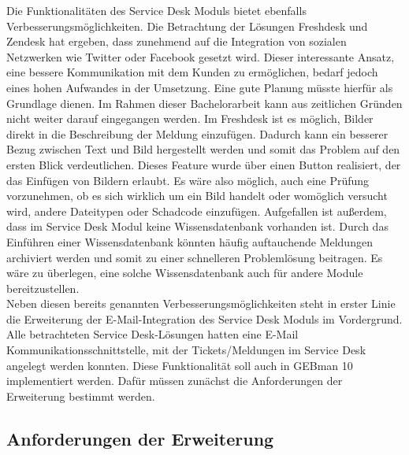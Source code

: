 \noindent
Die Funktionalitäten des Service Desk Moduls bietet ebenfalls Verbesserungsmöglichkeiten. Die Betrachtung der Lösungen Freshdesk und Zendesk hat ergeben, dass zunehmend auf die Integration von sozialen Netzwerken wie Twitter oder Facebook gesetzt wird. Dieser interessante Ansatz, eine bessere Kommunikation mit dem Kunden zu ermöglichen, bedarf jedoch eines hohen Aufwandes in der Umsetzung. Eine gute Planung müsste hierfür als Grundlage dienen. Im Rahmen dieser Bachelorarbeit kann aus zeitlichen Gründen nicht weiter darauf eingegangen werden.\newline 
Im Freshdesk ist es möglich, Bilder direkt in die Beschreibung der Meldung einzufügen. Dadurch kann ein besserer Bezug zwischen Text und Bild hergestellt werden und somit das Problem auf den ersten Blick verdeutlichen. Dieses Feature wurde über einen Button realisiert, der das Einfügen von Bildern erlaubt. Es wäre also möglich, auch eine Prüfung vorzunehmen, ob es sich wirklich um ein Bild handelt oder womöglich versucht wird, andere Dateitypen oder Schadcode einzufügen.\newline
Aufgefallen ist außerdem, dass im Service Desk Modul keine Wissensdatenbank vorhanden ist. Durch das Einführen einer Wissensdatenbank könnten häufig auftauchende Meldungen archiviert werden und somit zu einer schnelleren Problemlösung beitragen. Es wäre zu überlegen, eine solche Wissensdatenbank auch für andere Module bereitzustellen. \\

\noindent
Neben diesen bereits genannten Verbesserungsmöglichkeiten steht in erster Linie die Erweiterung der E-Mail-Integration des Service Desk Moduls im Vordergrund. Alle betrachteten Service Desk-Lösungen hatten eine E-Mail Kommunikationsschnittstelle, mit der Tickets/Meldungen im Service Desk angelegt werden konnten. Diese Funktionalität soll auch in GEBman 10 implementiert werden. Dafür müssen zunächst die Anforderungen der Erweiterung bestimmt werden.

\subsection{Anforderungen der Erweiterung}

